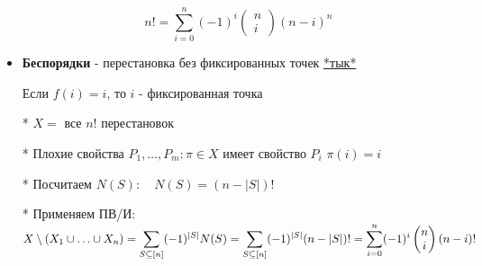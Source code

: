\documentclass[12pt]{article}
\begin{document}
\begin{itemize}
        \[n! = \sum_{i=0}^n (-1)^i \begin{pmatrix}
                                      n \\ i
        \end{pmatrix} (n - i)^n\]

        \item \textbf{Беспорядки} - перестановка без фиксированных точек
        \hfill\href{https://ru.wikipedia.org/wiki/%D0%91%D0%B5%D1%81%D0%BF%D0%BE%D1%80%D1%8F%D0%B4%D0%BE%D0%BA_(%D0%BF%D0%B5%D1%80%D0%B5%D1%81%D1%82%D0%B0%D0%BD%D0%BE%D0%B2%D0%BA%D0%B0)}{*тык*}

        Если $f(i) = i$, то $i$ - фиксированная точка

        * $X = $ все $n!$ перестановок

        * Плохие свойства $\displaystyle P_1,\dots,P_m : \pi \in X$ имеет свойство $\displaystyle P_i$ \Longleftrightarrow $\pi(i) = i$

        * Посчитаем $N(S): \quad N(S) = (n - |S|)!$

        * Применяем ПВ/И: $\displaystyle X \setminus (X_1 \union \dots \union X_n) = \sum_{S \subseteq [n]} (-1)^{|S|} N(S) =
        \sum_{S \subseteq [n]} (-1)^{|S|} (n - |S|)! = \sum_{i = 0}^n (-1)^{i} \begin{pmatrix}
                                                                                   n \\ i
        \end{pmatrix} (n - i)!$

    \end{itemize}
\end{document}
